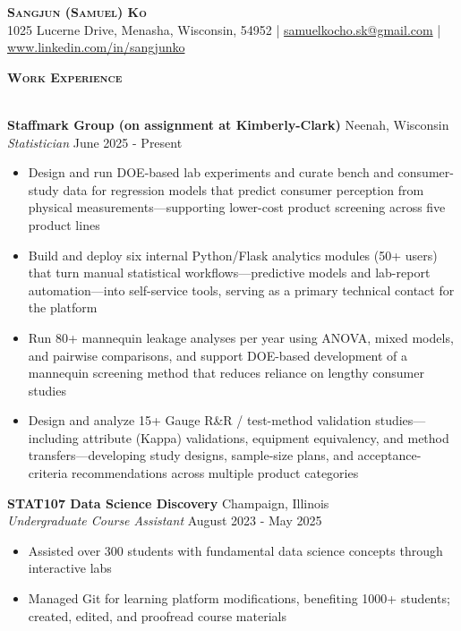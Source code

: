 \documentclass[a4paper]{article}
\newcommand{\lineunder} {
    \vspace*{-8pt} \\
    \hspace*{-18pt} \hrulefill \\
}
\newcommand{\header} [1] {
    {\hspace*{-18pt}\vspace*{6pt} \textsc{#1}}
    \vspace*{-6pt} \lineunder
}
\begin{document}
\vspace*{-40pt}

\vspace*{-10pt}
\begin{center}
	{\Huge \scshape \textbf{Sangjun (Samuel) Ko}}\\
    1025 Lucerne Drive, Menasha, Wisconsin, 54952
    | \href{mailto:samuelkocho.sk@gmail.com}{samuelkocho.sk@gmail.com}
    | \href{https://www.linkedin.com/in/sangjunko}{www.linkedin.com/in/sangjunko}
\end{center}

\header{\textbf{Work Experience}}
\vspace{1mm}

\textbf{Staffmark Group (on assignment at Kimberly-Clark)}
\hfill Neenah, Wisconsin\\
\textit{Statistician} \hfill June 2025 - Present\\
\begin{itemize}[noitemsep]
    \item Design and run DOE-based lab experiments and curate bench and consumer-study data for
    regression models that predict consumer perception from physical measurements---supporting
    lower-cost product screening across five product lines
    \item Build and deploy six internal Python/Flask analytics modules (50+ users) that turn manual
    statistical workflows---predictive models and lab-report automation---into self-service tools,
    serving as a primary technical contact for the platform
    \item Run 80+ mannequin leakage analyses per year using ANOVA, mixed models, and pairwise
    comparisons, and support DOE-based development of a mannequin screening method that reduces
    reliance on lengthy consumer studies
    \item Design and analyze 15+ Gauge R\&R / test-method validation studies---including attribute
    (Kappa) validations, equipment equivalency, and method transfers---developing study designs,
    sample-size plans, and acceptance-criteria recommendations across multiple product categories
\end{itemize}

\vspace{1mm}

\textbf{STAT107 Data Science Discovery}
\hfill Champaign, Illinois\\
\textit{Undergraduate Course Assistant} \hfill August 2023 - May 2025\\
    \begin{itemize}[noitemsep]
    \item Assisted over 300 students with fundamental data science concepts through interactive labs
    \item Managed Git for learning platform modifications,
    benefiting 1000+ students; created, edited, and proofread course materials
    \end{itemize}
\end{document}
